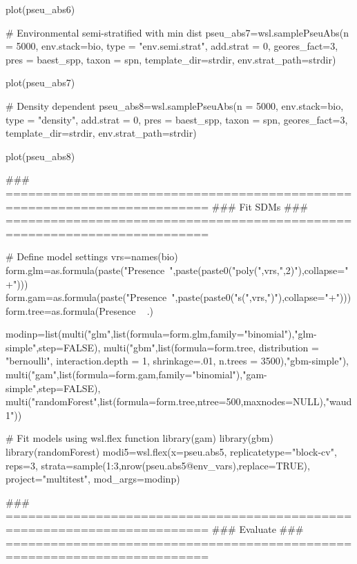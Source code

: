 \documentclass[a4paper]{book}
\begin{document}
\begin{Examples}
\begin{ExampleCode}
plot(pseu_abs6)

# Environmental semi-stratified with min dist
pseu_abs7=wsl.samplePseuAbs(n = 5000,
                           env.stack=bio,
                           type = "env.semi.strat",
                           add.strat = 0,
                           geores_fact=3,
                           pres = baest_spp,
                           taxon = spn,
                           template_dir=strdir,
                           env.strat_path=strdir)

plot(pseu_abs7)

# Density dependent
pseu_abs8=wsl.samplePseuAbs(n = 5000,
                           env.stack=bio,
                           type = "density",
                           add.strat = 0,
                           pres = baest_spp,
                           taxon = spn,
                           geores_fact=3,
                           template_dir=strdir,
                           env.strat_path=strdir)

plot(pseu_abs8)

### =========================================================================
### Fit SDMs
### =========================================================================

# Define model settings
vrs=names(bio)
form.glm=as.formula(paste("Presence~",paste(paste0("poly(",vrs,",2)"),collapse="+")))
form.gam=as.formula(paste("Presence~",paste(paste0("s(",vrs,")"),collapse="+")))
form.tree=as.formula(Presence ~ .)

modinp=list(multi("glm",list(formula=form.glm,family="binomial"),"glm-simple",step=FALSE),
           multi("gbm",list(formula=form.tree,
                distribution = "bernoulli",
                interaction.depth = 1,
                shrinkage=.01,
                n.trees = 3500),"gbm-simple"),
           multi("gam",list(formula=form.gam,family="binomial"),"gam-simple",step=FALSE),
           multi("randomForest",list(formula=form.tree,ntree=500,maxnodes=NULL),"waud1"))

# Fit models using wsl.flex function
library(gam)
library(gbm)
library(randomForest)
modi5=wsl.flex(x=pseu.abs5,
              replicatetype="block-cv",
              reps=3,
              strata=sample(1:3,nrow(pseu.abs5@env_vars),replace=TRUE),
              project="multitest",
              mod_args=modinp)

### =========================================================================
### Evaluate
### =========================================================================


\end{ExampleCode}
\end{Examples}
\end{document}
